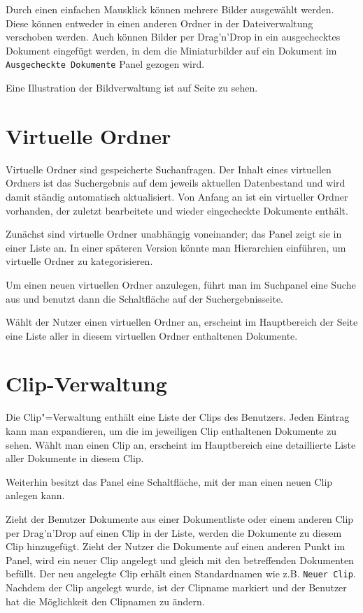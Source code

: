 Durch einen einfachen Mausklick können mehrere Bilder ausgewählt werden. Diese
können entweder in einen anderen Ordner in der Dateiverwaltung verschoben
werden. Auch können Bilder per Drag'n'Drop in ein ausgechecktes 
Dokument eingefügt werden, in dem die Miniaturbilder auf ein Dokument 
im \texttt{Ausgecheckte Dokumente} Panel gezogen wird.

Eine Illustration der Bildverwaltung ist auf Seite 
\pageref{bildverwaltung} zu sehen.

\section{Virtuelle Ordner}

Virtuelle Ordner sind gespeicherte Suchanfragen. Der Inhalt eines virtuellen
Ordners ist das Suchergebnis auf dem jeweils aktuellen Datenbestand und wird
damit ständig automatisch aktualisiert. Von Anfang an ist ein virtueller
Ordner vorhanden, der zuletzt bearbeitete und wieder eingecheckte Dokumente
enthält.

Zunächst sind virtuelle Ordner unabhängig voneinander; das Panel zeigt sie in
einer Liste an. In einer späteren Version könnte man Hierarchien einführen, um
virtuelle Ordner zu kategorisieren.

Um einen neuen virtuellen Ordner anzulegen, führt man im Suchpanel eine Suche
aus und benutzt dann die Schaltfläche  auf
der Suchergebnisseite.

Wählt der Nutzer einen virtuellen Ordner an, erscheint im Hauptbereich der
Seite eine Liste aller in diesem virtuellen Ordner enthaltenen Dokumente.


\section{Clip-Verwaltung} \label{sec-clips}

Die Clip"=Verwaltung enthält eine Liste der Clips des Benutzers. Jeden Eintrag
kann man expandieren, um die im jeweiligen Clip enthaltenen Dokumente zu
sehen. Wählt man einen Clip an, erscheint im Hauptbereich eine detaillierte
Liste aller Dokumente in diesem Clip.

Weiterhin besitzt das Panel eine Schaltfläche, mit der man einen neuen Clip
anlegen kann.

Zieht der Benutzer Dokumente aus einer Dokumentliste oder einem anderen Clip
per Drag'n'Drop auf einen Clip in der Liste, werden die Dokumente zu diesem
Clip hinzugefügt. Zieht der Nutzer die Dokumente auf einen anderen Punkt im Panel,
wird ein neuer Clip angelegt und gleich mit den betreffenden Dokumenten
befüllt. Der neu angelegte Clip erhält einen Standardnamen wie z.B. 
\texttt{Neuer Clip}. Nachdem der Clip angelegt wurde, ist der Clipname 
markiert und der Benutzer hat die Möglichkeit den Clipnamen zu ändern.

